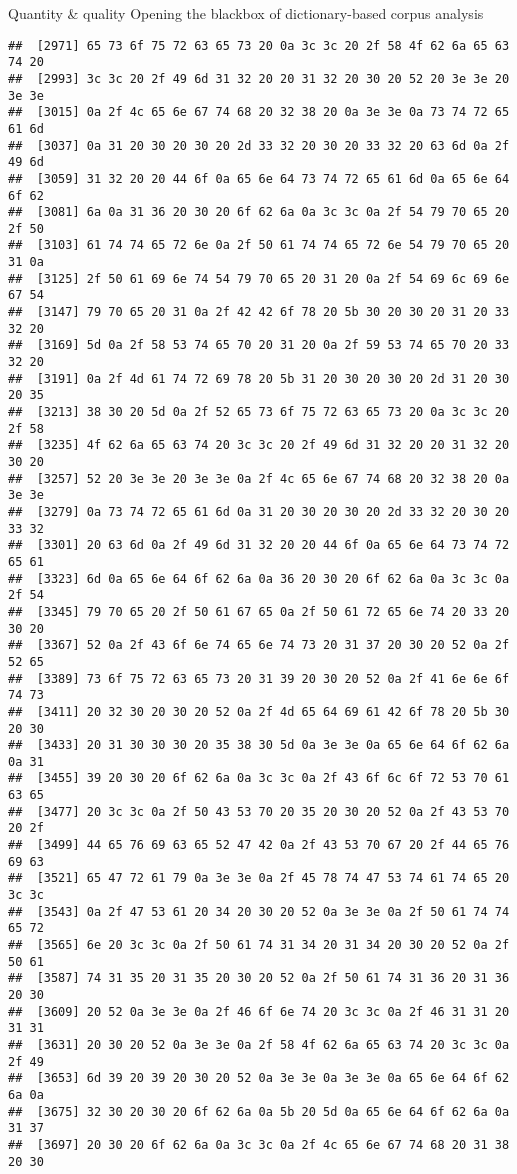 \documentclass[
  ignorenonframetext,
]{beamer}
\begin{document}
\begin{frame}[fragile]{Quantity \& quality \textbar{} Opening the
blackbox of dictionary-based corpus analysis}
\begin{verbatim}
##  [2971] 65 73 6f 75 72 63 65 73 20 0a 3c 3c 20 2f 58 4f 62 6a 65 63 74 20
##  [2993] 3c 3c 20 2f 49 6d 31 32 20 20 31 32 20 30 20 52 20 3e 3e 20 3e 3e
##  [3015] 0a 2f 4c 65 6e 67 74 68 20 32 38 20 0a 3e 3e 0a 73 74 72 65 61 6d
##  [3037] 0a 31 20 30 20 30 20 2d 33 32 20 30 20 33 32 20 63 6d 0a 2f 49 6d
##  [3059] 31 32 20 20 44 6f 0a 65 6e 64 73 74 72 65 61 6d 0a 65 6e 64 6f 62
##  [3081] 6a 0a 31 36 20 30 20 6f 62 6a 0a 3c 3c 0a 2f 54 79 70 65 20 2f 50
##  [3103] 61 74 74 65 72 6e 0a 2f 50 61 74 74 65 72 6e 54 79 70 65 20 31 0a
##  [3125] 2f 50 61 69 6e 74 54 79 70 65 20 31 20 0a 2f 54 69 6c 69 6e 67 54
##  [3147] 79 70 65 20 31 0a 2f 42 42 6f 78 20 5b 30 20 30 20 31 20 33 32 20
##  [3169] 5d 0a 2f 58 53 74 65 70 20 31 20 0a 2f 59 53 74 65 70 20 33 32 20
##  [3191] 0a 2f 4d 61 74 72 69 78 20 5b 31 20 30 20 30 20 2d 31 20 30 20 35
##  [3213] 38 30 20 5d 0a 2f 52 65 73 6f 75 72 63 65 73 20 0a 3c 3c 20 2f 58
##  [3235] 4f 62 6a 65 63 74 20 3c 3c 20 2f 49 6d 31 32 20 20 31 32 20 30 20
##  [3257] 52 20 3e 3e 20 3e 3e 0a 2f 4c 65 6e 67 74 68 20 32 38 20 0a 3e 3e
##  [3279] 0a 73 74 72 65 61 6d 0a 31 20 30 20 30 20 2d 33 32 20 30 20 33 32
##  [3301] 20 63 6d 0a 2f 49 6d 31 32 20 20 44 6f 0a 65 6e 64 73 74 72 65 61
##  [3323] 6d 0a 65 6e 64 6f 62 6a 0a 36 20 30 20 6f 62 6a 0a 3c 3c 0a 2f 54
##  [3345] 79 70 65 20 2f 50 61 67 65 0a 2f 50 61 72 65 6e 74 20 33 20 30 20
##  [3367] 52 0a 2f 43 6f 6e 74 65 6e 74 73 20 31 37 20 30 20 52 0a 2f 52 65
##  [3389] 73 6f 75 72 63 65 73 20 31 39 20 30 20 52 0a 2f 41 6e 6e 6f 74 73
##  [3411] 20 32 30 20 30 20 52 0a 2f 4d 65 64 69 61 42 6f 78 20 5b 30 20 30
##  [3433] 20 31 30 30 30 20 35 38 30 5d 0a 3e 3e 0a 65 6e 64 6f 62 6a 0a 31
##  [3455] 39 20 30 20 6f 62 6a 0a 3c 3c 0a 2f 43 6f 6c 6f 72 53 70 61 63 65
##  [3477] 20 3c 3c 0a 2f 50 43 53 70 20 35 20 30 20 52 0a 2f 43 53 70 20 2f
##  [3499] 44 65 76 69 63 65 52 47 42 0a 2f 43 53 70 67 20 2f 44 65 76 69 63
##  [3521] 65 47 72 61 79 0a 3e 3e 0a 2f 45 78 74 47 53 74 61 74 65 20 3c 3c
##  [3543] 0a 2f 47 53 61 20 34 20 30 20 52 0a 3e 3e 0a 2f 50 61 74 74 65 72
##  [3565] 6e 20 3c 3c 0a 2f 50 61 74 31 34 20 31 34 20 30 20 52 0a 2f 50 61
##  [3587] 74 31 35 20 31 35 20 30 20 52 0a 2f 50 61 74 31 36 20 31 36 20 30
##  [3609] 20 52 0a 3e 3e 0a 2f 46 6f 6e 74 20 3c 3c 0a 2f 46 31 31 20 31 31
##  [3631] 20 30 20 52 0a 3e 3e 0a 2f 58 4f 62 6a 65 63 74 20 3c 3c 0a 2f 49
##  [3653] 6d 39 20 39 20 30 20 52 0a 3e 3e 0a 3e 3e 0a 65 6e 64 6f 62 6a 0a
##  [3675] 32 30 20 30 20 6f 62 6a 0a 5b 20 5d 0a 65 6e 64 6f 62 6a 0a 31 37
##  [3697] 20 30 20 6f 62 6a 0a 3c 3c 0a 2f 4c 65 6e 67 74 68 20 31 38 20 30

\end{verbatim}
\end{frame}
\end{document}
